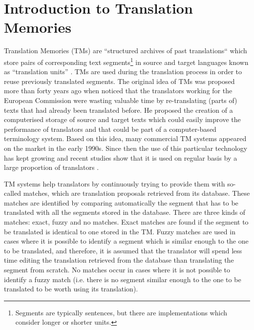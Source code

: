 \chapter{\label{cha:tm_introduction}Introduction to Translation Memories}

Translation Memories (TMs) are ``structured archives of past translations`` which store pairs of corresponding text segments\footnote{Segments are typically sentences, but there are implementations which consider longer or shorter units.} in source and target languages known as ``translation units'' \cite{Simard2020}. TMs are used during the translation process in order to reuse previously translated segments. The original idea of TMs was proposed more than forty years ago when \citet{Arthern1979} noticed that the translators working for the European Commission were wasting valuable time by re-translating (parts of) texts that had already been translated before. He proposed the creation of a computerised storage of source and target texts which could easily improve the performance of translators and that could be part of a computer-based terminology system. Based on this idea, many commercial TM systems appeared on the market in the early 1990s. Since then the use of this particular technology has kept growing and recent studies show that it is used on regular basis by a large proportion of translators  \cite{zaretskaya:2018}.

TM systems help translators by continuously trying to provide them with so-called matches, which are translation proposals retrieved from its database. These matches are identified by comparing automatically the segment that has to be translated with all the segments stored in the database. There are three kinds of matches: exact, fuzzy and no matches. Exact matches are found if the segment to be translated is identical to one stored in the TM. Fuzzy matches are used in cases where it is possible to identify a segment which is similar enough to the one to be translated, and therefore, it is assumed that the translator will spend less time editing the translation retrieved from the database than translating the segment from scratch. No matches occur in cases where it is not possible to identify a fuzzy match (i.e. there is no segment similar enough to the one to be translated to be worth using its translation).

